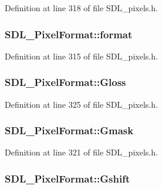 Definition at line 318 of file S\-D\-L\-\_\-pixels.\-h.

\hypertarget{struct_s_d_l___pixel_format_a44045e1da843f3d1fad3a608e16af712}{
\subsubsection[{format}]{ S\-D\-L\-\_\-\-Pixel\-Format\-::format}}\label{struct_s_d_l___pixel_format_a44045e1da843f3d1fad3a608e16af712}


Definition at line 315 of file S\-D\-L\-\_\-pixels.\-h.

\hypertarget{struct_s_d_l___pixel_format_a94469768d8436e631a13d68623ff663f}{
\subsubsection[{Gloss}]{ S\-D\-L\-\_\-\-Pixel\-Format\-::\-Gloss}}\label{struct_s_d_l___pixel_format_a94469768d8436e631a13d68623ff663f}


Definition at line 325 of file S\-D\-L\-\_\-pixels.\-h.

\hypertarget{struct_s_d_l___pixel_format_a3d07a81b430202c6ea0089d8df8f4e15}{
\subsubsection[{Gmask}]{ S\-D\-L\-\_\-\-Pixel\-Format\-::\-Gmask}}\label{struct_s_d_l___pixel_format_a3d07a81b430202c6ea0089d8df8f4e15}


Definition at line 321 of file S\-D\-L\-\_\-pixels.\-h.

\hypertarget{struct_s_d_l___pixel_format_a6045012f994c02a86bdc4a91b28d2a3c}{
\subsubsection[{Gshift}]{ S\-D\-L\-\_\-\-Pixel\-Format\-::\-Gshift}}\label{struct_s_d_l___pixel_format_a6045012f994c02a86bdc4a91b28d2a3c}


